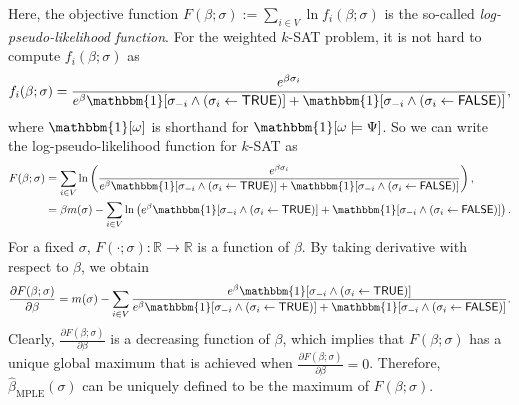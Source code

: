 \documentclass[11pt]{article}
\theoremstyle{definition}
\theoremstyle{remark}
\def\TRUE{\mathsf{TRUE}}
\def\FALSE{\mathsf{FALSE}}
\begin{document}
Here, the objective function $F(\beta;\sigma) :=\sum_{i\in V} \ln f_i(\beta; \sigma)$ is the so-called \emph{log-pseudo-likelihood function}. 
For the weighted $k$-SAT problem, it is not hard to compute $f_i(\beta; \sigma)$ as
\[
f_i(\beta;\sigma) = \frac{e^{\beta \sigma_i}}{e^\beta \mathbbm{1}[\sigma_{-i} \wedge (\sigma_i \leftarrow \TRUE)] + \mathbbm{1}[\sigma_{-i} \wedge (\sigma_i \leftarrow \FALSE)]},
\]
where  $\mathbbm{1}[\omega]$ is shorthand for 
$\mathbbm{1}[\omega \models \Psi]$.
So we can write the log-pseudo-likelihood function for $k$-SAT as
\begin{align*}
     F(\beta;\sigma)  &=
\sum_{i\in V} \ln \left( \frac{e^{\beta \sigma_i}}{e^\beta \mathbbm{1}[\sigma_{-i} \wedge (\sigma_i \leftarrow \TRUE)] + \mathbbm{1}[\sigma_{-i} \wedge (\sigma_i \leftarrow \FALSE)]} \right), \\
&= \beta m(\sigma) -\sum_{i\in V} \ln \left( e^\beta \mathbbm{1}[\sigma_{-i} \wedge (\sigma_i \leftarrow \TRUE)] + \mathbbm{1}[\sigma_{-i} \wedge (\sigma_i \leftarrow \FALSE)] \right).
\end{align*}
For a fixed $\sigma$, 
$F(\cdot;\sigma):\mathbb{R}\rightarrow\mathbb{R}$ is a function of $\beta$.
By taking derivative with respect to $\beta$, we obtain 
\begin{equation}
    \label{eq:derivative F}
    \frac{\partial F(\beta;\sigma)}{\partial \beta} =
    m(\sigma) - \sum_{i\in V} \frac{e^\beta  \mathbbm{1}[\sigma_{-i} \wedge (\sigma_i \leftarrow \TRUE)] }{ e^\beta \mathbbm{1}[\sigma_{-i} \wedge (\sigma_i \leftarrow \TRUE)] + \mathbbm{1}[\sigma_{-i} \wedge (\sigma_i \leftarrow \FALSE)]}. 
\end{equation}
Clearly, $\frac{\partial F(\beta;\sigma)}{\partial \beta}$ is a decreasing function of $\beta$, which implies that $F(\beta;\sigma)$ has a unique global maximum  that is achieved when $\frac{\partial F(\beta;\sigma)}{\partial \beta}=0$.
Therefore, $ \hat{\beta}_{\mathrm{MPLE}}(\sigma)$ can be uniquely defined to be the maximum of $F(\beta;\sigma)$. 
\end{document}
